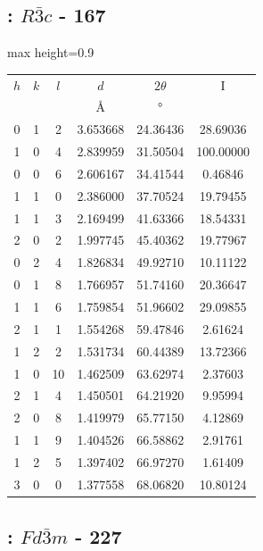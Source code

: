 \documentclass[twoside,a4paper,11pt,addpoints,answers]{exam}%
\begin{document}
\subsection{ : $R\bar{3}c$ - 167}

\begin{center}
\begin{adjustbox}{max height=0.9\textwidth}
\begin{tabular}{cccccc}
\toprule
$h$ & $k$ & $l$ & $d$ & $2 \theta$ & I \\
 & & & \si{\angstrom} &  \si{\degree} &  \\ 
\midrule
 0 & 1 &  2 &  3.653668 &   24.36436 &   28.69036 \\
 1 & 0 &  4 &  2.839959 &   31.50504 &  100.00000 \\
 0 & 0 &  6 &  2.606167 &   34.41544 &    0.46846 \\
 1 & 1 &  0 &  2.386000 &   37.70524 &   19.79455 \\
 1 & 1 &  3 &  2.169499 &   41.63366 &   18.54331 \\
 2 & 0 &  2 &  1.997745 &   45.40362 &   19.77967 \\
 0 & 2 &  4 &  1.826834 &   49.92710 &   10.11122 \\
 0 & 1 &  8 &  1.766957 &   51.74160 &   20.36647 \\
 1 & 1 &  6 &  1.759854 &   51.96602 &   29.09855 \\
 2 & 1 &  1 &  1.554268 &   59.47846 &    2.61624 \\
 1 & 2 &  2 &  1.531734 &   60.44389 &   13.72366 \\
 1 & 0 & 10 &  1.462509 &   63.62974 &    2.37603 \\
 2 & 1 &  4 &  1.450501 &   64.21920 &    9.95994 \\
 2 & 0 &  8 &  1.419979 &   65.77150 &    4.12869 \\
 1 & 1 &  9 &  1.404526 &   66.58862 &    2.91761 \\
 1 & 2 &  5 &  1.397402 &   66.97270 &    1.61409 \\
 3 & 0 &  0 &  1.377558 &   68.06820 &   10.80124 \\
\bottomrule
\end{tabular}
\end{adjustbox}
\end{center}

\subsection{ : $Fd\bar{3}m$ - 227}
\end{document}
